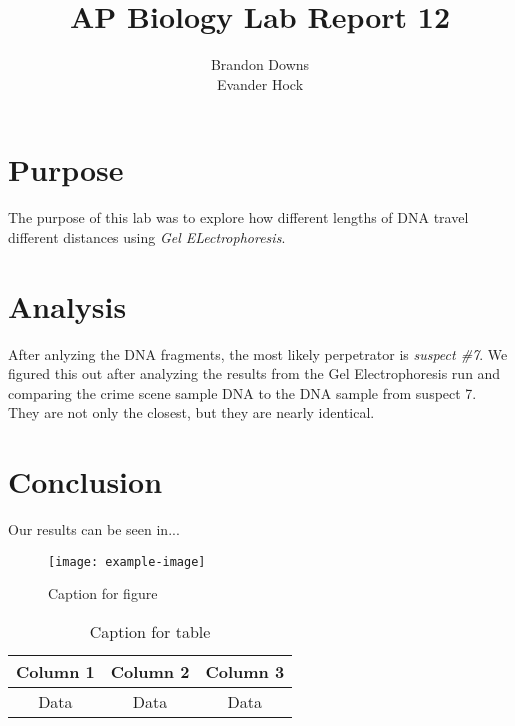 \documentclass[12pt]{article}
\title{AP Biology Lab Report 12}
\author{Brandon Downs \\ Evander Hock}
\begin{document}
\maketitle

\section{Purpose}

The purpose of this lab was to explore how different lengths of DNA travel different distances using \textit{Gel ELectrophoresis}.

\section{Analysis}

After anlyzing the DNA fragments, the most likely perpetrator is \textit{suspect \#7}. We figured this out after analyzing the results from the Gel Electrophoresis run and comparing the crime scene sample DNA to the DNA sample from suspect 7. They are not only the closest, but they are nearly identical.

\section{Conclusion}

Our results can be seen in...

\begin{figure}
    \centering
    \texttt{[image: example-image]}
    \caption{Caption for figure}
    \label{fig:label}
\end{figure}

\begin{table}
    \centering
    \begin{tabular}{|c|c|c|}
        \hline
        Column 1 & Column 2 & Column 3 \\
        \hline
        Data & Data & Data \\
        \hline
    \end{tabular}
    \caption{Caption for table}
    \label{tab:label}
\end{table}
\end{document}
